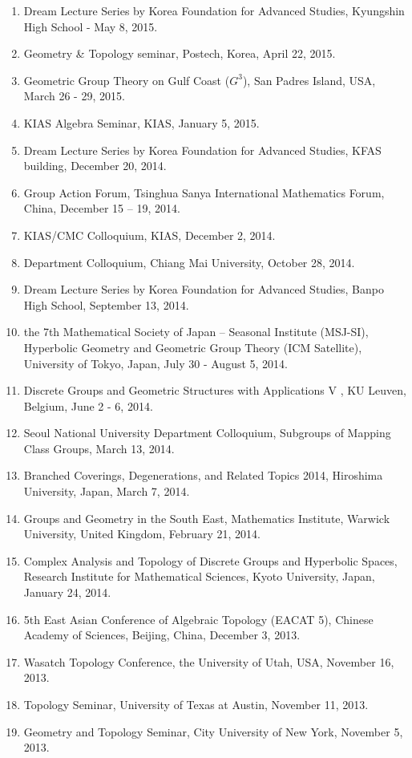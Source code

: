 \documentclass[11pt,a4paper]{article}
\begin{document}
\begin{enumerate}[leftmargin=1.5em, label=\arabic*.]
\item Dream Lecture Series by Korea Foundation for Advanced Studies, Kyungshin High School - May 8, 2015.
\item Geometry \& Topology seminar, Postech, Korea, April 22, 2015.
\item Geometric Group Theory on Gulf Coast ($G^3$), San Padres Island, USA, March 26 - 29, 2015.
\item KIAS Algebra Seminar, KIAS, January 5, 2015.
\item Dream Lecture Series by Korea Foundation for Advanced Studies, KFAS building, December 20, 2014.
\item Group Action Forum, Tsinghua Sanya International Mathematics Forum, China, December 15 -- 19, 2014.
\item KIAS/CMC Colloquium, KIAS, December 2, 2014.
\item Department Colloquium, Chiang Mai University, October 28, 2014.
\item Dream Lecture Series by Korea Foundation for Advanced Studies, Banpo High School, September 13, 2014.
\item the 7th Mathematical Society of Japan -- Seasonal Institute (MSJ-SI), Hyperbolic Geometry and Geometric Group Theory (ICM Satellite), University of Tokyo, Japan, July 30 - August 5, 2014.
\item Discrete Groups and Geometric Structures with Applications V , KU Leuven, Belgium, June 2 - 6, 2014.
\item Seoul National University Department Colloquium, Subgroups of Mapping Class Groups, March 13, 2014.
\item Branched Coverings, Degenerations, and Related Topics 2014, Hiroshima University, Japan, March 7, 2014.
\item Groups and Geometry in the South East, Mathematics Institute, Warwick University, United Kingdom, February 21, 2014.
\item Complex Analysis and Topology of Discrete Groups and Hyperbolic Spaces, Research Institute for Mathematical Sciences, Kyoto University, Japan, January 24, 2014.
\item 5th East Asian Conference of Algebraic Topology (EACAT 5), Chinese Academy of Sciences, Beijing, China, December 3, 2013.
\item Wasatch Topology Conference, the University of Utah, USA, November 16, 2013.
\item Topology Seminar, University of Texas at Austin, November 11, 2013.
\item Geometry and Topology Seminar, City University of New York, November 5, 2013.

\end{enumerate}
\end{document}
